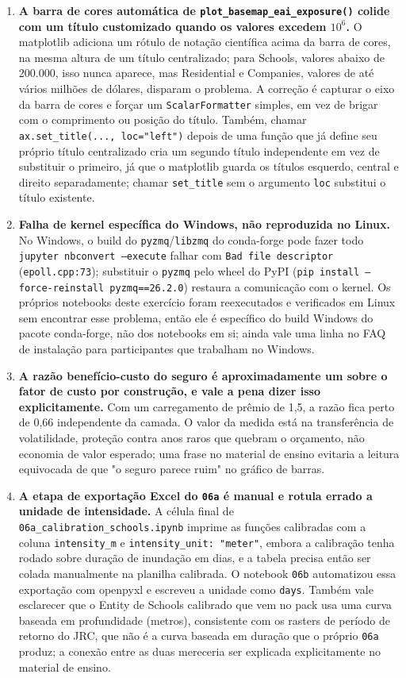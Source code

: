 \documentclass[11pt]{article}
\begin{document}
\begin{enumerate}
\item \textbf{A barra de cores automática de \texttt{plot\_basemap\_eai\_exposure()}
colide com um título customizado quando os valores excedem $10^6$.} O matplotlib adiciona
um rótulo de notação científica acima da barra de cores, na mesma altura de um título
centralizado; para Schools, valores abaixo de 200.000, isso nunca aparece, mas Residential
e Companies, valores de até vários milhões de dólares, disparam o problema. A correção é
capturar o eixo da barra de cores e forçar um \texttt{ScalarFormatter} simples, em vez de
brigar com o comprimento ou posição do título. Também, chamar
\texttt{ax.set\_title(..., loc="left")} depois de uma função que já define seu próprio
título centralizado cria um segundo título independente em vez de substituir o primeiro,
já que o matplotlib guarda os títulos esquerdo, central e direito separadamente; chamar
\texttt{set\_title} sem o argumento \texttt{loc} substitui o título existente.

\item \textbf{Falha de kernel específica do Windows, não reproduzida no Linux.} No
Windows, o build do \texttt{pyzmq}/\texttt{libzmq} do conda-forge pode fazer todo
\texttt{jupyter nbconvert --execute} falhar com \texttt{Bad file descriptor}
(\texttt{epoll.cpp:73}); substituir o \texttt{pyzmq} pelo wheel do PyPI
(\texttt{pip install --force-reinstall pyzmq==26.2.0}) restaura a comunicação com o
kernel. Os próprios notebooks deste exercício foram reexecutados e verificados em Linux
sem encontrar esse problema, então ele é específico do build Windows do pacote
conda-forge, não dos notebooks em si; ainda vale uma linha no FAQ de instalação para
participantes que trabalham no Windows.

\item \textbf{A razão benefício-custo do seguro é aproximadamente um sobre o fator de
custo por construção, e vale a pena dizer isso explicitamente.} Com um carregamento de
prêmio de 1,5, a razão fica perto de 0,66 independente da camada. O valor da medida está
na transferência de volatilidade, proteção contra anos raros que quebram o orçamento, não
economia de valor esperado; uma frase no material de ensino evitaria a leitura equivocada
de que "o seguro parece ruim" no gráfico de barras.

\item \textbf{A etapa de exportação Excel do \texttt{06a} é manual e rotula errado a
unidade de intensidade.} A célula final de \texttt{06a\_calibration\_schools.ipynb}
imprime as funções calibradas com a coluna \texttt{intensity\_m} e
\texttt{intensity\_unit: "meter"}, embora a calibração tenha rodado sobre duração de
inundação em dias, e a tabela precisa então ser colada manualmente na planilha calibrada.
O notebook \texttt{06b} automatizou essa exportação com openpyxl e escreveu a unidade
como \texttt{days}. Também vale esclarecer que o Entity de Schools calibrado que vem no
pack usa uma curva baseada em profundidade (metros), consistente com os rasters de período
de retorno do JRC, que não é a curva baseada em duração que o próprio \texttt{06a}
produz; a conexão entre as duas mereceria ser explicada explicitamente no material de
ensino.
\end{enumerate}
\end{document}
